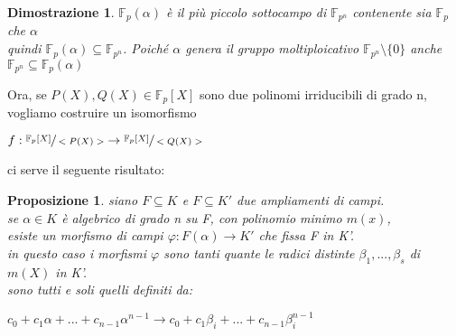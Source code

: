\documentclass[a4paper,12pt]{article}
\theoremstyle{def}
\theoremstyle{prop}
\newtheorem*{proposition}{Proposizione}
\theoremstyle{esempio}
\theoremstyle{dimostrazione}
\newtheorem*{dimostrazione}{Dimostrazione}
\theoremstyle{teo}
\theoremstyle{osservazione}
\begin{document}
\begin{dimostrazione}
    \(\mathbb{F}_p(\alpha)\) è il più piccolo sottocampo di \(\mathbb{F}_{p^n}\) contenente sia \(\mathbb{F}_p\) che \(\alpha\)\\
    quindi \(\mathbb{F}_p(\alpha) \subseteq \mathbb{F}_{p^n}\). Poiché \(\alpha\) genera il gruppo moltiploicativo \(\mathbb{F}_{p^n} \setminus \{0\}\) anche \(\mathbb{F}_{p^n} \subseteq \mathbb{F}_p(\alpha)\)
\end{dimostrazione}

\newpage

Ora, se \(P(X), Q(X) \in \mathbb{F}_p[X]\) sono due polinomi irriducibili di grado n,\\
vogliamo costruire un isomorfismo 
\begin{center}
    \(f: \sfrac{\mathbb{F}_p[X]}{<P(X)>} \rightarrow \sfrac{\mathbb{F}_p[X]}{<Q(X)>}\)
\end{center}
ci serve il seguente risultato:

\begin{proposition}
    siano \(F \subseteq K\) e \(F \subseteq K'\) due ampliamenti di campi.\\
    se \(\alpha \in K\) è algebrico di grado n su F, con polinomio minimo \(m(x)\),\\
    esiste un morfismo di campi \(\varphi : F(\alpha) \rightarrow K'\) che fissa F in K'.\\
    in questo caso i morfismi \(\varphi\) sono tanti quante le radici distinte \(\beta_1, ... ,\beta_s\) di \(m(X)\) in K'.\\
    sono tutti e soli quelli definiti da:
    \begin{center}
        \(c_0 + c_1\alpha + ... + c_{n-1}\alpha^{n-1} \rightarrow c_0 + c_1\beta_i + ... + c_{n-1}\beta_i^{n-1} \)
    \end{center}
\end{proposition}
\end{document}
